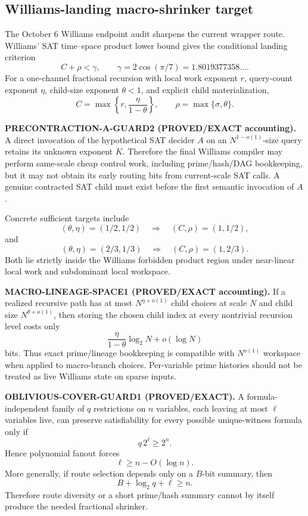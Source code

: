 \documentclass[11pt]{article}
\theoremstyle{plain}
\theoremstyle{definition}
\theoremstyle{remark}
\begin{document}
\subsection{Williams-landing macro-shrinker target}

The October 6 Williams endpoint audit sharpens the current wrapper route.
Williams' SAT time--space product lower bound gives the conditional landing
criterion
\[
\boxed{
C+\rho<\gamma,
\qquad
\gamma=2\cos(\pi/7)=1.8019377358\ldots.
}
\]
For a one-channel fractional recursion with local work exponent \(r\),
query-count exponent \(\eta\), child-size exponent \(\theta<1\), and explicit
child materialization,
\[
C=\max\left\{r,\frac{\eta}{1-\theta}\right\},
\qquad
\rho=\max\{\sigma,\theta\}.
\]

\textbf{PRECONTRACTION-A-GUARD2 (PROVED/EXACT accounting).}
A direct invocation of the hypothetical SAT decider \(A\) on an
\(N^{1-o(1)}\)-size query retains its unknown exponent \(K\).  Therefore the
final Williams compiler may perform same-scale cheap control work, including
prime/hash/DAG bookkeeping, but it may not obtain its early routing bits from
current-scale SAT calls.  A genuine contracted SAT child must exist before the
first semantic invocation of \(A\).

Concrete sufficient targets include
\[
(\theta,\eta)=(1/2,1/2)
\quad\Longrightarrow\quad
(C,\rho)=(1,1/2),
\]
and
\[
(\theta,\eta)=(2/3,1/3)
\quad\Longrightarrow\quad
(C,\rho)=(1,2/3).
\]
Both lie strictly inside the Williams forbidden product region under
near-linear local work and subdominant local workspace.

\textbf{MACRO-LINEAGE-SPACE1 (PROVED/EXACT accounting).}
If a realized recursive path has at most \(N^{\eta+o(1)}\) child choices at
scale \(N\) and child size \(N^{\theta+o(1)}\), then storing the chosen child
index at every nontrivial recursion level costs only
\[
\frac{\eta}{1-\theta}\log_2N+o(\log N)
\]
bits.  Thus exact prime/lineage bookkeeping is compatible with
\(N^{o(1)}\) workspace when applied to macro-branch choices.  Per-variable
prime histories should not be treated as live Williams state on sparse inputs.

\textbf{OBLIVIOUS-COVER-GUARD1 (PROVED/EXACT).}
A formula-independent family of \(q\) restrictions on \(n\) variables, each
leaving at most \(\ell\) variables live, can preserve satisfiability for every
possible unique-witness formula only if
\[
q\,2^\ell\ge2^n.
\]
Hence polynomial fanout forces
\[
\ell\ge n-O(\log n).
\]
More generally, if route selection depends only on a \(B\)-bit summary, then
\[
B+\log_2q+\ell\ge n.
\]
Therefore route diversity or a short prime/hash summary cannot by itself
produce the needed fractional shrinker.
\end{document}
